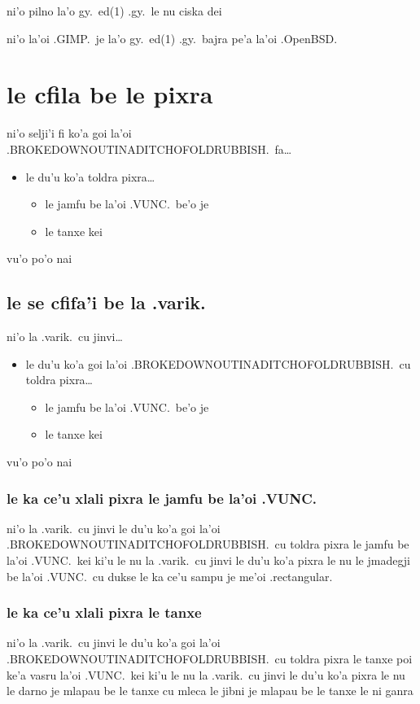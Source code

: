 \documentclass{report}
\begin{document}
ni'o pilno la'o gy.\ ed(1) .gy.\ le nu ciska dei

ni'o la'oi .GIMP.\ je la'o gy.\ ed(1) .gy.\ bajra pe'a la'oi .OpenBSD.

\section{le cfila be le pixra}
ni'o selji'i fi ko'a goi la'oi .BROKEDOWNOUTINADITCHOFOLDRUBBISH.\ fa\ldots
\begin{itemize}
	\item le du'u ko'a toldra pixra\ldots
	\begin{itemize}
		\item le jamfu be la'oi .VUNC.\ be'o je
		\item le tanxe kei
	\end{itemize}
\end{itemize}
vu'o po'o nai

\subsection{le se cfifa'i be la .varik.}
ni'o la .varik.\ cu jinvi\ldots
\begin{itemize}
	\item le du'u ko'a goi la'oi .BROKEDOWNOUTINADITCHOFOLDRUBBISH.\ cu toldra pixra\ldots
	\begin{itemize}
		\item le jamfu be la'oi .VUNC.\ be'o je
		\item le tanxe kei
	\end{itemize}
\end{itemize}
vu'o po'o nai

\subsubsection{le ka ce'u xlali pixra le jamfu be la'oi .VUNC.}
ni'o la .varik.\ cu jinvi le du'u ko'a goi la'oi .BROKEDOWNOUTINADITCHOFOLDRUBBISH.\ cu toldra pixra le jamfu be la'oi .VUNC.\ kei ki'u le nu la .varik.\ cu jinvi le du'u ko'a pixra le nu le jmadegji be la'oi .VUNC.\ cu dukse le ka ce'u sampu je me'oi .rectangular.

\subsubsection{le ka ce'u xlali pixra le tanxe}
ni'o la .varik.\ cu jinvi le du'u ko'a goi la'oi .BROKEDOWNOUTINADITCHOFOLDRUBBISH.\ cu toldra pixra le tanxe poi ke'a vasru la'oi .VUNC.\ kei ki'u le nu la .varik.\ cu jinvi le du'u ko'a pixra le nu le darno je mlapau be le tanxe cu mleca le jibni je mlapau be le tanxe le ni ganra
\end{document}
